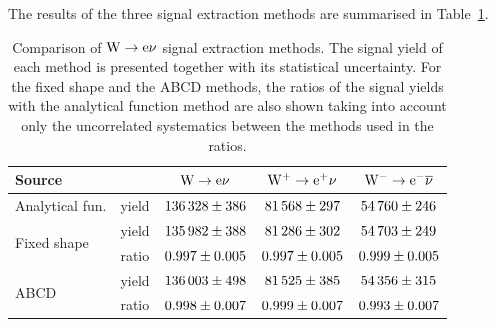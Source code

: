 

\label{sec:e-Wsigextr-ABCDE}



The results of the three signal extraction methods are summarised in Table~\ref{tab:WsignalCollection}.

\begin{table}[htbp] %
\begin{center}
   \caption[.]{ \label{tab:WsignalCollection}
Comparison of $\mathrm{W} \rightarrow \mathrm{e}\nu$ signal extraction methods. The signal yield of each method is presented together with
its statistical uncertainty.
For the fixed shape and the ABCD methods, the ratios of the signal yields with the analytical function method
are also shown taking into account only the uncorrelated systematics between the methods used in the ratios.}
\begin {tabular} {|l|l|c|c|c|}
\hline
\multicolumn{2}{|l|}{Source}        & $\mathrm{W} \rightarrow \mathrm{e}\nu$           & $\mathrm{W^+} \rightarrow \mathrm{e}^+\nu$           & $\mathrm{W^-} \rightarrow \mathrm{e}^-\overline{\nu}$            \\
\hline\hline
Analytical fun. &yield    & $ 136\,328 \pm 386   $      &  $  81\,568 \pm 297   $      &  $  54\,760 \pm 246   $      \\
\hline
\multirow{2}{*}{Fixed shape} & yield                         & $ 135\,982 \pm 388   $    &  $  81\,286 \pm 302   $    &  $  54\,703 \pm 249   $      \\
 & ratio & $ 0.997 \pm 0.005   $   &  $ 0.997 \pm 0.005   $   &  $ 0.999 \pm 0.005   $      \\
\hline
\multirow{2}{*}{ABCD} & yield                                & $ 136\,003 \pm 498   $    & $  81\,525 \pm 385   $     & $  54\,356 \pm 315   $    \\
 & ratio       & $ 0.998 \pm 0.007   $   & $ 0.999 \pm 0.007   $    & $ 0.993 \pm 0.007   $    \\
\hline
\end {tabular}
\end{center}
\end{table}

